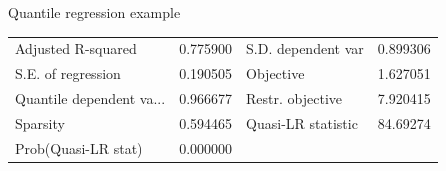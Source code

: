 \documentclass{beamer}
\begin{document}
\begin{frame}{Quantile regression example}
\begin{table}[]
\begin{tabular}{@{}lllll@{}}
Adjusted R-squared                                                                             & 0.775900                                                                         & \multicolumn{2}{l}{S.D. dependent var}                                                                                                                              & 0.899306                                                                       \\
S.E. of regression                                                                             & 0.190505                                                                         & \multicolumn{2}{l}{Objective}                                                                                                                                       & 1.627051                                                                       \\
Quantile dependent va...                                                                       & 0.966677                                                                         & \multicolumn{2}{l}{Restr. objective}                                                                                                                                & 7.920415                                                                       \\
Sparsity                                                                                       & 0.594465                                                                         & \multicolumn{2}{l}{Quasi-LR statistic}                                                                                                                              & 84.69274                                                                       \\
Prob(Quasi-LR stat)                                                                            & 0.000000                                                                         & \multicolumn{2}{l}{}                                                                                                                                                &                                                                                \\ \bottomrule
\end{tabular}
\end{table}
\end{frame}
\end{document}
